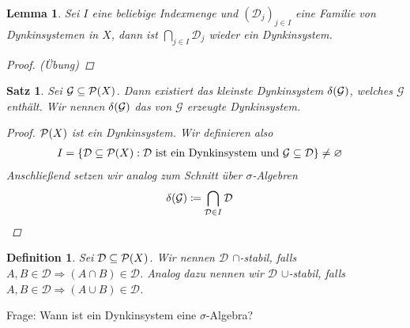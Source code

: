 \documentclass[11pt, twoside, a4paper]{article}
\theoremstyle{plain}
\newtheorem{definition}[blockelement]{Definition}
\newtheorem{lemma}[blockelement]{Lemma}
\newtheorem{satz}[blockelement]{Satz}
\numberwithin{equation}{subsection}
\newcommand{\set}[1]{\left\{#1\right\}}
\newcommand{\pair}[1]{\left(#1\right)}
\newcommand{\of}[1]{\mathopen{}\mathclose{}\bgroup\left(#1\aftergroup\egroup\right)}
\newcommand{\impl}[0]{\Rightarrow{}}
\renewcommand{\emptyset}{\varnothing}
\newcommand{\mD}{\mathcal{D}}
\newcommand{\mG}{\mathcal{G}}
\newcommand{\mP}{\mathcal{P}}
\begin{document}
    \begin{lemma}
        Sei $I$ eine beliebige Indexmenge und $(\mD_j)_{j\in I}$ eine Familie von Dynkinsystemen in $X$, dann ist $\displaystyle\bigcap_{j\in I} \mD_j$ wieder ein Dynkinsystem.
        \begin{proof}
        (Übung)
        \end{proof}
    \end{lemma}

    \begin{satz} %
        Sei $\mG \subseteq\mP\of{X}$. Dann existiert das kleinste Dynkinsystem $\delta\of{\mG}$, welches $\mG$ enthält. Wir nennen $\delta\of{\mG}$ das von $\mG$ erzeugte Dynkinsystem.
        \begin{proof}
            $\mP\of{X}$ ist ein Dynkinsystem. Wir definieren also
            \begin{align*}
                I &= \set{\mD\subseteq\mP\of{X}: \mD\text{ ist ein Dynkinsystem und }\mG\subseteq\mD} \neq \emptyset
            \end{align*}
            Anschließend setzen wir analog zum Schnitt über $\sigma$-Algebren
            \begin{align*}
                \delta\of{\mG} &\coloneqq \bigcap_{\mD\in I} \mD\qedhere
            \end{align*}
        \end{proof}
    \end{satz}

    \begin{definition}
        Sei $\mD\subseteq\mP\of{X}$. Wir nennen $\mD$ $\cap$-stabil, falls $A, B \in\mD \impl \pair{A \cap B} \in\mD$. Analog dazu nennen wir $\mD$ $\cup$-stabil, falls $A, B \in\mD \impl \pair{A \cup B} \in\mD$.
    \end{definition}

    Frage: Wann ist ein Dynkinsystem eine $\sigma$-Algebra?
\end{document}
